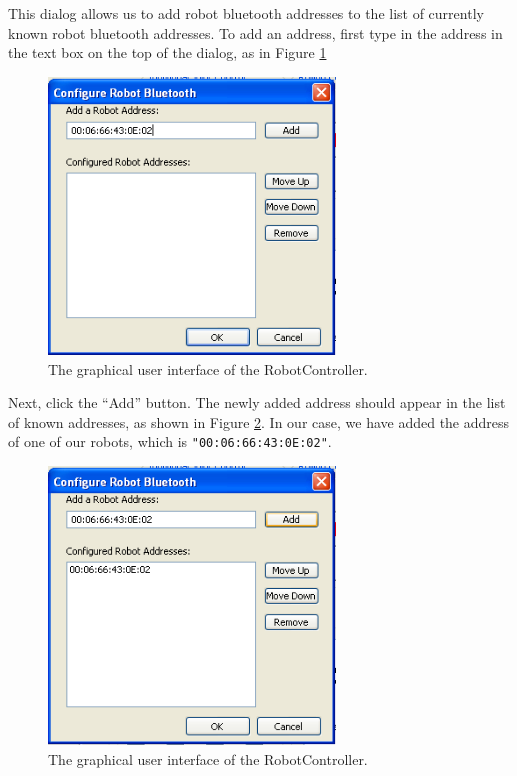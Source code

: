 \documentclass{article}
\begin{document}
This dialog allows us to add robot bluetooth addresses to the list of currently
known robot bluetooth addresses. To add an address, first type in the address
in the text box on the top of the dialog, as in Figure \ref{fig:shot5.png}

\begin{figure}[H]
\begin{center}
\includegraphics[width=3in]{images/shot5.png}
\end{center}
\caption{\label{fig:shot5.png} The graphical user interface of the RobotController.}
\end{figure}

Next, click the ``Add'' button. The newly added address should appear in the 
list of known addresses, as shown in Figure \ref{fig:shot6.png}. In our case, we have added the 
address of one of our robots, which is \texttt{"00:06:66:43:0E:02"}.

\begin{figure}[H]
\begin{center}
\includegraphics[width=3in]{images/shot6.png}
\end{center}
\caption{\label{fig:shot6.png} The graphical user interface of the RobotController.}
\end{figure}
\end{document}
